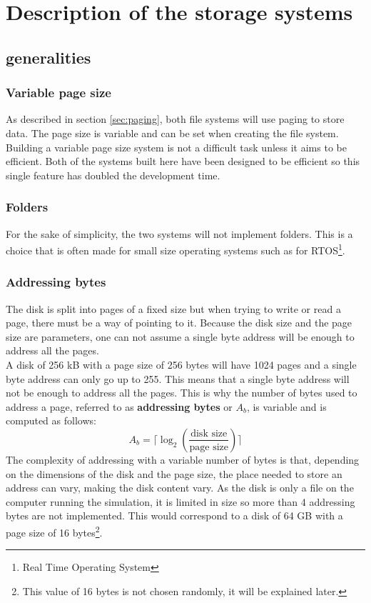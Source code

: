 \documentclass[10pt,a4paper]{ULBreport}
\begin{document}
\chapter{Description of the storage systems}

\section{generalities}
\subsection{Variable page size}
As described in section \ref{sec:paging}, both file systems will use paging to store data. The page size is variable and can be set when creating the file system. Building a variable page size system is not a difficult task unless it aims to be efficient. Both of the systems built here have been designed to be efficient so this single feature has doubled the development time.
\subsection{Folders}
For the sake of simplicity, the two systems will not implement folders. This is a choice that is often made for small size operating systems such as for RTOS\footnote{Real Time Operating System}.
\subsection{Addressing bytes}
The disk is split into pages of a fixed size but when trying to write or read a page, there must be a way of pointing to it. Because the disk size and the page size are parameters, one can not assume a single byte address will be enough to address all the pages. \\
A disk of 256 kB with a page size of 256 bytes will have 1024 pages and a single byte address can only go up to 255. This means that a single byte address will not be enough to address all the pages. This is why the number of bytes used to address a page, referred to as \textbf{addressing bytes} or $A_b$, is variable and is computed as follows:
\begin{equation*}
    A_b = \lceil \log_2\left(\frac{\text{disk size}}{\text{page size}}\right) \rceil
\end{equation*}
The complexity of addressing with a variable number of bytes is that, depending on the dimensions of the disk and the page size, the place needed to store an address can vary, making the disk content vary. As the disk is only a file on the computer running the simulation, it is limited in size so more than 4 addressing bytes are not implemented. This would correspond to a disk of 64 GB with a page size of 16 bytes\footnote{This value of 16 bytes is not chosen randomly, it will be explained later.}.
\end{document}
